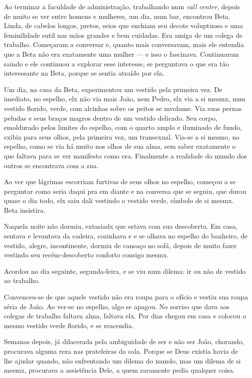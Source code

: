 \documentclass[11pt,a4paper,twoside,openany]{book}
\begin{document}
Ao terminar a faculdade de administração, trabalhando num \emph{call center}, depois de muito se ver entre homens e mulheres, um dia, num bar, encontrou Beta. Linda, de cabelos longos, pretos, seios que enchiam seu decote voluptuoso e uma feminilidade sutil nas mãos grandes e bem cuidadas. Era amiga de um colega de trabalho. Começaram a conversar e, quanto mais conversavam, mais ele entendia que a Beta não era exatamente uma mulher --- e isso o fascinava. Continuaram saindo e ele continuou a explorar esse interesse, se perguntava o que era tão interessante na Beta, porque se sentia atraído por ela.

Um dia, na casa da Beta, experimentou um vestido pela primeira vez. De imediato, no espelho, elx não via mais João, nem Pedro, elx via a si mesmx, num vestido florido, verde, com alcinhas sobre os peitos se mvolume. Via suas pernas peludas e seus braços magros dentro de um vestido delicado. Seu corpo, emoldurado pelos limites do espelho, com o quarto amplo e iluminado de fundo, exibia para seus olhos, pela primeira vez, um transexual. Via-se a si mesmo, no espelho, como se via há muito nos olhos de sua alma, sem saber exatamente o que faltava para se ver manifesto como era. Finalmente a realidade do mundo dos outros se encontrava com a sua.

Ao ver que lágrimas escorriam furtivas de seus olhos no espelho, começou a se perguntar como seria daqui pra em diante e na conversa que se seguiu, que durou quase o dia todo, elx saiu dali vestindo o vestido verde, símbolo de si mesmx. Beta insistira.

Naquela noite não dormiu, extasiadx que estava com sua descoberta. Em casa, sentava e levantava da cadeira, cozinhava e e se olhava no espelho do banheiro, de vestido, alegre, incontinente, dormiu de cansaço no sofá, depois de muito fazer vestindo seu recém-descoberto conforto consigo mesmx.

Acordou no dia seguinte, segunda-feira, e se viu num dilema: ir ou não de vestido ao trabalho.

Convenceu-se de que aquele vestido não era roupa para o ofício e vestiu sua roupa séria de João. Ao ver-se no espelho, algo se apagou. No sorriso que dava aos colegas de trabalho faltava alma, faltava elx. Por dias chegou em casa e colocou o mesmo vestido verde florido, e se reacendia.

Semanas depois, já dilacerada pela ambiguidade de ser e não ser João, chorando, procurava alguma reza nas prateleiras da sala. Porque se Deus existia havia de lhe ajudar quando, não enfrentando um dilema do mundo, mas um dilema de si mesmx, procurava a assistência Dele, a quem raramente pedia qualquer coisa.
\end{document}
